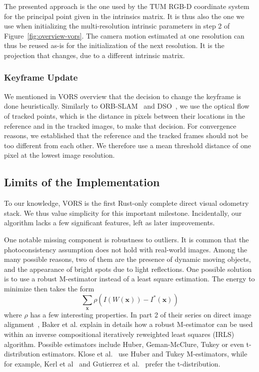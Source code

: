 The presented approach is the one used by the TUM RGB-D coordinate system
for the principal point given in the intrinsics matrix.
It is thus also the one we use when initializing the multi-resolution intrinsic
parameters in step 2 of Figure~\ref{fig:overview-vors}.
The camera motion estimated at one resolution can thus be reused as-is
for the initialization of the next resolution.
It is the projection that changes, due to a different intrinsic matrix.

\subsubsection{Keyframe Update}%
\label{ssub:keyframe-update}

We mentioned in VORS overview that the decision to change the keyframe is done heuristically.
Similarly to ORB-SLAM~\cite{mur2015orb} and DSO~\cite{engel2017direct},
we use the optical flow of tracked points, which is
the distance in pixels between their locations in the reference and in the tracked images,
to make that decision.
For convergence reasons, we established that the reference and the tracked frames
should not be too different from each other.
We therefore use a mean threshold distance of one pixel at the lowest image resolution.


\subsection{Limits of the Implementation}%
\label{sub:limits-implementation}

To our knowledge,
VORS is the first Rust-only complete direct visual odometry stack.
We thus value simplicity for this important milestone.
Incidentally, our algorithm lacks a few significant features,
left as later improvements.

One notable missing component is robustness to outliers.
It is common that the photoconsistency assumption does not hold with real-world images.
Among the many possible reasons, two of them are the presence of dynamic moving objects,
and the appearance of bright spots due to light reflections.
One possible solution is to use a robust M-estimator instead of a least square estimation.
The energy to minimize then takes the form
\[
	\sum_{\bm{x}}\rho(I(W(\bm{x})) - I^{*}(\bm{x}))
\]
where $\rho$ has a few interesting properties.
In part 2 of their series on direct image alignment~\cite{baker2003lucas},
Baker et al. explain in details how a robust M-estimator can be used
within an inverse compositional iteratively reweighted least squares (IRLS) algorithm.
Possible estimators include Huber, Geman-McClure, Tukey or even t-distribution estimators.
Klose et al.~\cite{klose2013efficient} use Huber and Tukey M-estimators,
while for example, Kerl et al~\cite{kerl2013robust}
and Gutierrez et al.~\cite{gutierrez2015inverse} prefer the t-distribution.

